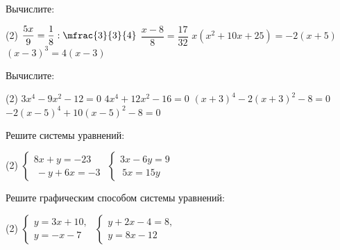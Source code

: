 \begin{class}[number=8]
	\begin{listofex}
		\item Вычислите:
		\begin{tasks}(2)
			\task \( \dfrac{5x}{9}=\dfrac{1}{8}:\mfrac{3}{3}{4} \)
			\task \( \dfrac{x-8}{8}=\dfrac{17}{32}\)
			\task \( x(x^{2}+10x+25)=-2(x+5) \)
			\task \( (x-3)^{3}=4(x-3)\)
		\end{tasks}
		\item Вычислите:
		\begin{tasks}(2)
			\task \( 3x^{4} - 9x^{2} - 12 = 0 \)
			\task \( 4x^{4} + 12x^{2} - 16 = 0 \)
			\task \( (x+3)^{4}-2(x+3)^{2}-8=0 \)
			\task \( -2(x-5)^{4}+10(x-5)^{2}-8=0 \)
		\end{tasks}
		\item  Решите системы уравнений:
		\begin{tasks}(2)
			\task \( \begin{cases}
				8x+y=-23 \\\
				-y+6x=-3
			\end{cases} \)
			\task \( \begin{cases}
				3x-6y=9 \\\
				5x=15y
			\end{cases} \)
		\end{tasks}
		\item Решите графическим способом системы уравнений:
		\begin{tasks}(2)
			\task \( \begin{cases} y=3x+10,\\y=-x-7 \end{cases} \)
			\task \( \begin{cases} y+2x-4=8,\\y=8x-12 \end{cases} \)
		\end{tasks}
	\end{listofex}
\end{class}
